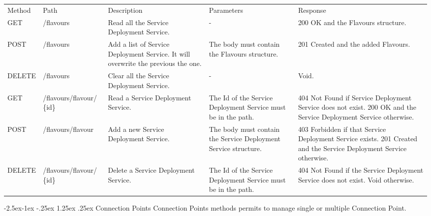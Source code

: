 \documentclass[11pt, english]{article}
\makeatletter
\renewcommand\paragraph{\@startsection{paragraph}{4}{\z@}%
            {-2.5ex\@plus -1ex \@minus -.25ex}%
            {1.25ex \@plus .25ex}%
            {\normalfont\normalsize\bfseries}}
\makeatother
\begin{document}
\begin{tabular}{ |p{2cm}|m{3cm}|p{3cm}|p{3cm}|p{4cm}| }
    \hline
    \rowcolor{black} \multicolumn{5}{|c|}{\textcolor{white}{Flavours}} \\
    \hline
    \rowcolor{Gray}
    Method & Path & Description & Parameters & Response \\
    \hline
    GET   & /flavours & Read all the Service Deployment Service. & - & 200 OK and the Flavours structure. \\
    \hline
    POST & /flavours & Add a list of Service Deployment Service. It will overwrite the previous the one. & The body must contain the Flavours structure. & 201 Created and the added Flavours. \\
    \hline
    DELETE & /flavours & Clear all the Service Deployment Service. & - & Void. \\
    \hline
    GET & /flavours/flavour/ \{id\} & Read a Service Deployment Service. & The Id of the Service Deployment Service must be in the path. & 404 Not Found if Service Deployment Service does not exist. 200 OK and the Service Deployment Service otherwise. \\
    \hline
    POST & /flavours/flavour & Add a new Service Deployment Service. & The body must contain the Service Deployment Service structure. & 403 Forbidden if that Service Deployment Service exists. 201 Created and the Service Deployment Service otherwise. \\
    \hline
    DELETE & /flavours/flavour/ \{id\} & Delete a Service Deployment Service. & The Id of the Service Deployment Service must be in the path. & 404 Not Found if the Service Deployment Service does not exist. Void otherwise. \\
    \hline
\end{tabular}

\newpage
\paragraph{Connection Points}
Connection Points methods permits to manage single or multiple Connection Point. \\
\end{document}
